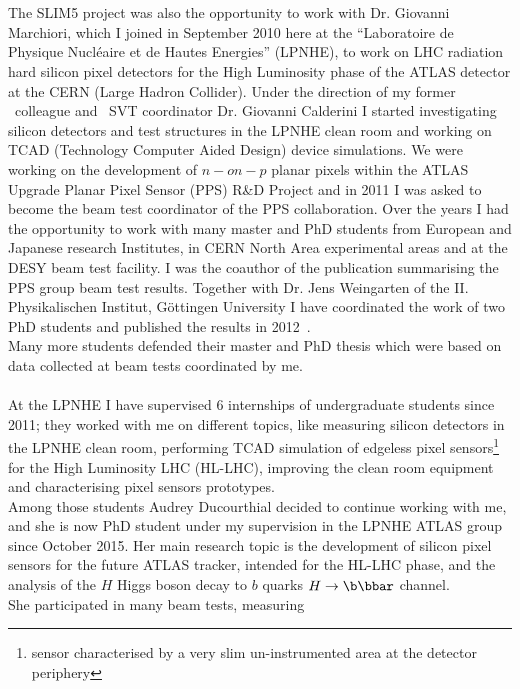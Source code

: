 \\
\\
The SLIM5 project was also the opportunity to work with Dr. Giovanni Marchiori, which I  joined in 
September 2010 here 
at the ``Laboratoire de Physique Nucl\'eaire et de Hautes Energies'' (LPNHE), to work on LHC
radiation hard silicon pixel detectors for the High Luminosity phase of the  ATLAS detector at the CERN  
(Large Hadron Collider). Under the direction of my former \babar\ colleague and \babar\ SVT coordinator
Dr. Giovanni Calderini I started investigating silicon detectors and test structures in the LPNHE clean room 
  and working on TCAD (Technology Computer Aided Design) device simulations.
We were working on the development of $n-on-p$ planar pixels within the ATLAS Upgrade Planar Pixel 
Sensor (PPS) R\&D Project and in 2011 I was asked to become the beam test coordinator of the PPS 
collaboration. Over the years I had the opportunity to work with many master and PhD students from
 European and Japanese research Institutes, in CERN North Area experimental areas and at the DESY 
 beam test facility. 
I was the coauthor of the publication summarising  the PPS group beam test 
results. Together with Dr. Jens Weingarten of the  II. Physikalischen Institut, G\"ottingen University 
I have coordinated the work of two PhD students and published the results in 2012~\cite{1748-0221-7-10-P10028}. \\
Many more students defended their master and PhD thesis which were based on data collected at 
beam tests coordinated by me.
\\ \\
At the LPNHE I have supervised  6 internships of undergraduate students since 2011; 
they worked with me on different topics, like measuring silicon detectors
 in the LPNHE clean room, performing TCAD 
simulation of edgeless pixel sensors\footnote{sensor characterised by a very slim un-instrumented area at 
the detector periphery}~\cite{bib:nim2012} for the 
High Luminosity LHC (HL-LHC), improving the clean room equipment  and characterising pixel sensors 
prototypes. 
\\
Among those students Audrey Ducourthial decided to continue working with me, and she is 
now PhD student under my supervision in the LPNHE ATLAS group since October 2015. 
Her main research topic is the development of silicon pixel sensors for the future ATLAS tracker, intended 
for the HL-LHC phase, and the analysis of the $H$ Higgs boson decay to $b$ quarks
 $H\to\b\bbar$ channel.
\\She participated in many beam tests, measuring 
